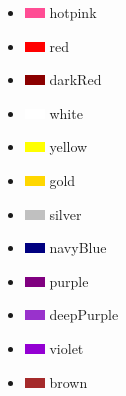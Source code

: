 \documentclass[10pt]{article}
\begin{document}
\begin{itemize}
    \item \includegraphics{images/colors/hotpink.png} hotpink
    \item \includegraphics{images/colors/red.png} red
    \item \includegraphics{images/colors/darkRed.png} darkRed
    \item \includegraphics{images/colors/white.png} white
    \item \includegraphics{images/colors/yellow.png} yellow
    \item \includegraphics{images/colors/gold.png} gold
    \item \includegraphics{images/colors/silver.png} silver
    \item \includegraphics{images/colors/navyBlue.png} navyBlue
    \item \includegraphics{images/colors/purple.png} purple
    \item \includegraphics{images/colors/deepPurple.png} deepPurple
    \item \includegraphics{images/colors/violet.png} violet
    \item \includegraphics{images/colors/brown.png} brown

\end{itemize}
\end{document}
